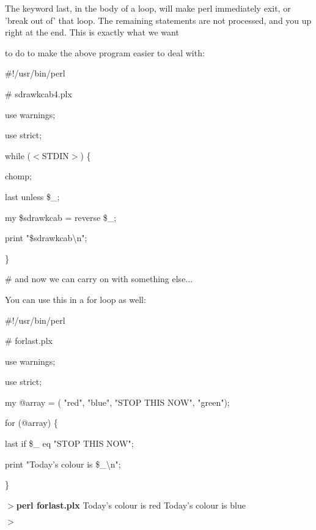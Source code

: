 \documentclass[a4paper,11pt]{book}
\begin{document}
\noindent 

\noindent The keyword last, in the body of a loop, will make perl immediately exit, or 'break out of' that loop. The remaining statements are not processed, and you up right at the end. This is exactly what we want

\noindent to do to make the above program easier to deal with:

\noindent 

\noindent 

\noindent \#!/usr/bin/perl

\noindent \# sdrawkcab4.plx

\noindent use warnings;

\noindent use strict;

\noindent 

\noindent while ($<$STDIN$>$) \{

\noindent chomp;

\noindent last unless \$\_;

\noindent my \$sdrawkcab = reverse \$\_;

\noindent print "\$sdrawkcab\textbackslash n";

\noindent \}

\noindent \# and now we can carry on with something else...

\noindent 

\noindent You can use this in a for loop as well:

\noindent 

\noindent 

\noindent \#!/usr/bin/perl

\noindent \# forlast.plx

\noindent use warnings;

\noindent use strict;

\noindent 

\noindent my @array = ( "red", "blue", "STOP THIS NOW", "green");

\noindent for (@array) \{

\noindent last if \$\_  eq "STOP THIS NOW";

\noindent print "Today's colour is \$\_\textbackslash n";

\noindent \}

\noindent 

\noindent $>$\textbf{perl forlast.plx }Today's colour is red Today's colour is blue

\noindent $>$

\noindent 
\end{document}
